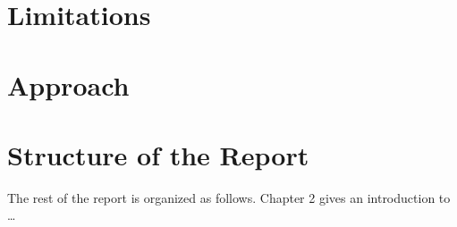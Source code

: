 \section{Limitations}

\section{Approach}

\section{Structure of the Report}
The rest of the report is organized as follows. Chapter 2 gives an introduction to \ldots
